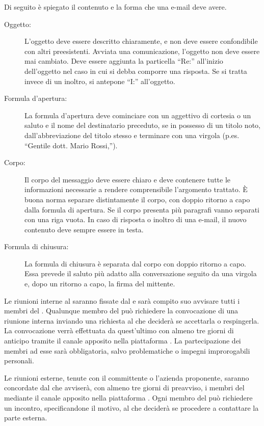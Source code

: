\documentclass[a4paper, titlepage]{article}
\begin{document}
Di seguito è spiegato il contenuto e la forma che una e-mail deve avere.
\begin{description}
	\item[Oggetto:] 
	L'oggetto deve essere descritto chiaramente, e non deve essere confondibile con altri preesistenti. Avviata una comunicazione, l'oggetto non deve essere mai cambiato. Deve essere aggiunta la particella ``Re:'' all'inizio dell'oggetto nel caso in cui si debba comporre una risposta. Se si tratta invece di un inoltro, si antepone ``I:'' all'oggetto.
	\item[Formula d'apertura:] 
	La formula d'apertura deve cominciare con un aggettivo di cortesia o un saluto e il nome del destinatario preceduto, se in possesso di un titolo noto, dall'abbreviazione del titolo stesso e terminare con una virgola (p.es. ``Gentile dott. Mario Rossi,'').
	\item[Corpo:] 
	Il corpo del messaggio deve essere chiaro e deve contenere tutte le informazioni necessarie a rendere comprensibile l'argomento trattato. È buona norma separare distintamente il corpo, con doppio ritorno a capo dalla formula di apertura. Se il corpo presenta più paragrafi vanno separati con una riga vuota. In caso di risposta o inoltro di una e-mail, il nuovo contenuto deve sempre essere in testa.
	\item[Formula di chiusura:] 
	La formula di chiusura è separata dal corpo con doppio ritorno a capo. Essa prevede il saluto più adatto alla conversazione seguito da una virgola e, dopo un ritorno a capo, la firma del mittente.
\end{description}


\newpage



Le riunioni interne al  saranno fissate dal  e sarà compito suo avvisare tutti i membri del . Qualunque membro del  può richiedere la convocazione di una riunione interna inviando una richiesta al  che deciderà se accettarla o respingerla. La convocazione verrà effettuata da quest'ultimo con almeno tre giorni di anticipo tramite il canale apposito nella piattaforma . La partecipazione dei membri ad esse sarà obbligatoria, salvo problematiche o impegni improrogabili personali.

Le riunioni esterne, tenute con il committente o l'azienda proponente, saranno concordate dal  che avviserà, con almeno tre giorni di preavviso, i membri del  mediante il canale apposito nella piattaforma . Ogni membro del  può richiedere un incontro, specificandone il motivo, al  che deciderà se procedere a contattare la parte esterna.
\end{document}

